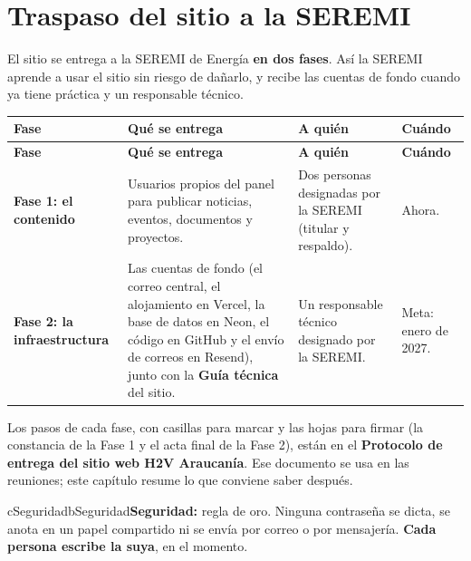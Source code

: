 \documentclass[11pt,letterpaper]{report}
\begin{document}
\chapter{Traspaso del sitio a la SEREMI}
El sitio se entrega a la SEREMI de Energía \textbf{en dos fases}. Así la SEREMI aprende a usar el sitio sin riesgo de dañarlo, y recibe las cuentas de fondo cuando ya tiene práctica y un responsable técnico.

\begin{longtable}{>{\raggedright\arraybackslash}p{}>{\raggedright\arraybackslash}p{}>{\raggedright\arraybackslash}p{}>{\raggedright\arraybackslash}p{}}
\rowcolor{h2vazul}\textbf{\color{white}Fase} & \textbf{\color{white}Qué se entrega} & \textbf{\color{white}A quién} & \textbf{\color{white}Cuándo} \\
\endfirsthead
\rowcolor{h2vazul}\textbf{\color{white}Fase} & \textbf{\color{white}Qué se entrega} & \textbf{\color{white}A quién} & \textbf{\color{white}Cuándo} \\
\endhead
\textbf{Fase 1: el contenido} & Usuarios propios del panel para publicar noticias, eventos, documentos y proyectos. & Dos personas designadas por la SEREMI (titular y respaldo). & Ahora. \\ \midrule
\rowcolor{filaalt}\textbf{Fase 2: la infraestructura} & Las cuentas de fondo (el correo central, el alojamiento en Vercel, la base de datos en Neon, el código en GitHub y el envío de correos en Resend), junto con la \textbf{Guía técnica} del sitio. & Un responsable técnico designado por la SEREMI. & Meta: enero de 2027. \\ \bottomrule
\end{longtable}
Los pasos de cada fase, con casillas para marcar y las hojas para firmar (la constancia de la Fase 1 y el acta final de la Fase 2), están en el \textbf{Protocolo de entrega del sitio web H2V Araucanía}. Ese documento se usa en las reuniones; este capítulo resume lo que conviene saber después.

\begin{recuadro}{cSeguridad}{bSeguridad}\textbf{\color{bSeguridad}Seguridad:} regla de oro. Ninguna contraseña se dicta, se anota en un papel compartido ni se envía por correo o por mensajería. \textbf{Cada persona escribe la suya}, en el momento.\end{recuadro}
\end{document}
